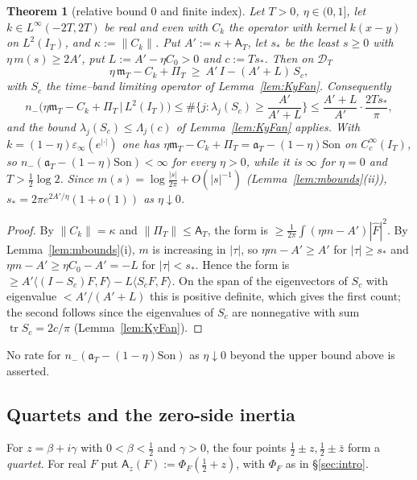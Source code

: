 \documentclass[11pt]{amsart}
\newtheorem{theorem}{Theorem}[section]
\theoremstyle{definition}
\theoremstyle{remark}
\newcommand{\IT}{I_T}
\newcommand{\Fh}{\widehat F}
\newcommand{\Aconst}{\mathsf A_T}
\newcommand{\PiT}{\Pi_T}
\newcommand{\mT}{\mathfrak m_T}
\begin{document}
\begin{theorem}[relative bound $0$ and finite index]\label{thm:inertia-finite}
Let $T>0$, $\eta\in(0,1]$, let $k\in L^\infty(-2T,2T)$ be real and even with $C_k$ the operator with kernel $k(x-y)$ on
$L^2(\IT)$, and $\kappa:=\|C_k\|$. Put $A':=\kappa+\Aconst$, let $s_*$ be the least $s\ge0$ with $\eta\,m(s)\ge2A'$, put
$L:=A'-\eta C_0>0$ and $c:=Ts_*$. Then on $\mathcal D_T$
\[
\eta\,\mT-C_k+\PiT\ \ge\ A'\,I-(A'+L)\,S_c ,
\]
with $S_c$ the time--band limiting operator of Lemma~\ref{lem:KyFan}. Consequently
\[
n_-\big(\eta\mT-C_k+\PiT\,\big|\,L^2(\IT)\big)\le\#\Big\{j:\lambda_j(S_c)\ge\frac{A'}{A'+L}\Big\}
\le\frac{A'+L}{A'}\cdot\frac{2Ts_*}{\pi},
\]
and the bound $\lambda_j(S_c)\le\Lambda_j(c)$ of Lemma~\ref{lem:KyFan} applies. With $k=(1-\eta)\varepsilon_\infty(e^{|\cdot|})$
one has $\eta\mT-C_k+\PiT=\mathfrak a_T-(1-\eta)\mathrm{Son}$ on $C_c^\infty(\IT)$, so
$n_-(\mathfrak a_T-(1-\eta)\mathrm{Son})<\infty$ for every $\eta>0$, while it is $\infty$ for $\eta=0$ and $T>\frac12\log2$.
Since $m(s)=\log\frac{|s|}{2\pi}+O(|s|^{-1})$ (Lemma~\ref{lem:mbounds}(ii)), $s_*=2\pi e^{2A'/\eta}(1+o(1))$ as
$\eta\downarrow0$.
\end{theorem}
\begin{proof}
By $\|C_k\|=\kappa$ and $\|\PiT\|\le\Aconst$, the form is $\ge\frac1{2\pi}\int(\eta m-A')|\Fh|^2$. By
Lemma~\ref{lem:mbounds}(i), $m$ is increasing in $|\tau|$, so $\eta m-A'\ge A'$ for $|\tau|\ge s_*$ and
$\eta m-A'\ge\eta C_0-A'=-L$ for $|\tau|<s_*$. Hence the form is $\ge A'\langle(I-S_c)F,F\rangle-L\langle S_cF,F\rangle$. On the
span of the eigenvectors of $S_c$ with eigenvalue $<A'/(A'+L)$ this is positive definite, which gives the first count;
the second follows since the eigenvalues of $S_c$ are nonnegative with sum $\operatorname{tr}S_c=2c/\pi$ (Lemma~\ref{lem:KyFan}).
\end{proof}
No rate for $n_-(\mathfrak a_T-(1-\eta)\mathrm{Son})$ as $\eta\downarrow0$ beyond the upper bound above is asserted.

\subsection{Quartets and the zero-side inertia}
For $z=\beta+i\gamma$ with $0<\beta<\frac12$ and $\gamma>0$, the four points $\frac12\pm z,\frac12\pm\bar z$ form a
\emph{quartet}. For real $F$ put $\mathsf A_z(F):=\Phi_F(\frac12+z)$, with $\Phi_F$ as in \S\ref{sec:intro}.
\end{document}
